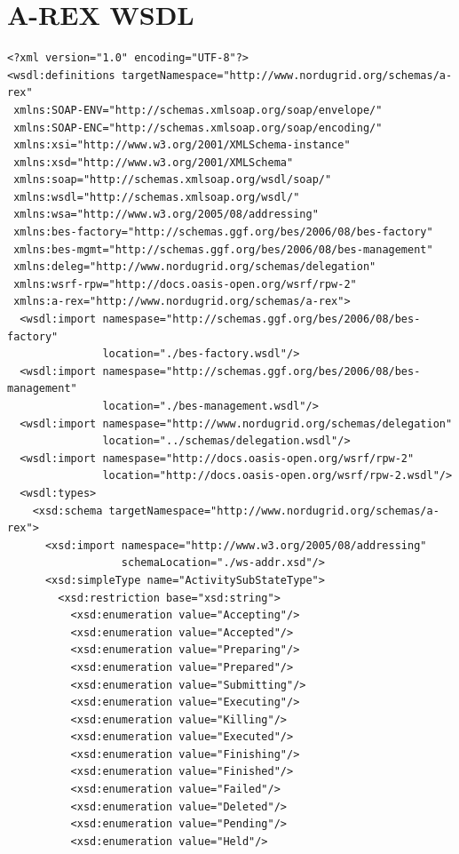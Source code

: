 \documentclass{article}                            %
\begin{document}
\section{A-REX WSDL\label{annex:arex-wsdl}}

\begin{footnotesize}\begin{verbatim}
<?xml version="1.0" encoding="UTF-8"?>
<wsdl:definitions targetNamespace="http://www.nordugrid.org/schemas/a-rex"
 xmlns:SOAP-ENV="http://schemas.xmlsoap.org/soap/envelope/"
 xmlns:SOAP-ENC="http://schemas.xmlsoap.org/soap/encoding/"
 xmlns:xsi="http://www.w3.org/2001/XMLSchema-instance"
 xmlns:xsd="http://www.w3.org/2001/XMLSchema"
 xmlns:soap="http://schemas.xmlsoap.org/wsdl/soap/"
 xmlns:wsdl="http://schemas.xmlsoap.org/wsdl/"
 xmlns:wsa="http://www.w3.org/2005/08/addressing"
 xmlns:bes-factory="http://schemas.ggf.org/bes/2006/08/bes-factory"
 xmlns:bes-mgmt="http://schemas.ggf.org/bes/2006/08/bes-management"
 xmlns:deleg="http://www.nordugrid.org/schemas/delegation"
 xmlns:wsrf-rpw="http://docs.oasis-open.org/wsrf/rpw-2"
 xmlns:a-rex="http://www.nordugrid.org/schemas/a-rex">
  <wsdl:import namespase="http://schemas.ggf.org/bes/2006/08/bes-factory"
               location="./bes-factory.wsdl"/>
  <wsdl:import namespase="http://schemas.ggf.org/bes/2006/08/bes-management"
               location="./bes-management.wsdl"/>
  <wsdl:import namespase="http://www.nordugrid.org/schemas/delegation"
               location="../schemas/delegation.wsdl"/>
  <wsdl:import namespase="http://docs.oasis-open.org/wsrf/rpw-2"
               location="http://docs.oasis-open.org/wsrf/rpw-2.wsdl"/>
  <wsdl:types>
    <xsd:schema targetNamespace="http://www.nordugrid.org/schemas/a-rex">
      <xsd:import namespace="http://www.w3.org/2005/08/addressing"
                  schemaLocation="./ws-addr.xsd"/>
      <xsd:simpleType name="ActivitySubStateType">
        <xsd:restriction base="xsd:string">
          <xsd:enumeration value="Accepting"/>
          <xsd:enumeration value="Accepted"/>
          <xsd:enumeration value="Preparing"/>
          <xsd:enumeration value="Prepared"/>
          <xsd:enumeration value="Submitting"/>
          <xsd:enumeration value="Executing"/>
          <xsd:enumeration value="Killing"/>
          <xsd:enumeration value="Executed"/>
          <xsd:enumeration value="Finishing"/>
          <xsd:enumeration value="Finished"/>
          <xsd:enumeration value="Failed"/>
          <xsd:enumeration value="Deleted"/>
          <xsd:enumeration value="Pending"/>
          <xsd:enumeration value="Held"/>

\end{verbatim}
\end{footnotesize}
\end{document}

